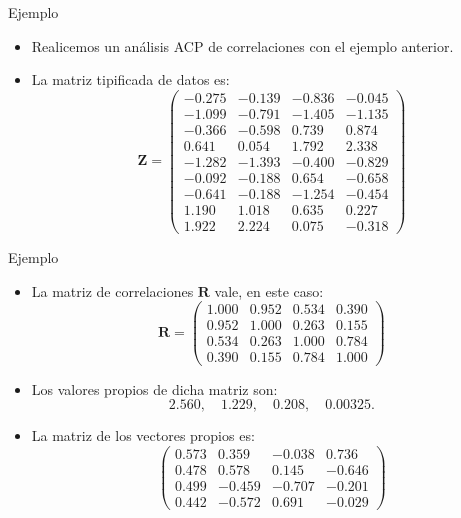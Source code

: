 \documentclass[
  ignorenonframetext,
]{beamer}
\providecommand{\tightlist}{%
  \setlength{\itemsep}{0pt}\setlength{\parskip}{0pt}}
\begin{document}
\begin{frame}{Ejemplo}
\protect\hypertarget{ejemplo-11}{}
\begin{itemize}
\tightlist
\item
  Realicemos un análisis ACP de correlaciones con el ejemplo anterior.
\item
  La matriz tipificada de datos es: \[
  \mathbf{Z}=
  \left(
  \begin{array}{rrrr}
  -0.275 & -0.139 & -0.836 & -0.045 \\
   -1.099 & -0.791 & -1.405 & -1.135 \\
   -0.366 & -0.598 & 0.739 & 0.874 \\
   0.641 & 0.054 & 1.792 & 2.338 \\
   -1.282 & -1.393 & -0.400 & -0.829 \\
   -0.092 & -0.188 & 0.654 & -0.658 \\
   -0.641 & -0.188 & -1.254 & -0.454 \\
   1.190 & 1.018 & 0.635 & 0.227 \\
   1.922 & 2.224 & 0.075 & -0.318 
  \end{array}
  \right)
  \]
\end{itemize}
\end{frame}

\begin{frame}{Ejemplo}
\protect\hypertarget{ejemplo-12}{}
\begin{itemize}
\tightlist
\item
  La matriz de correlaciones \(\mathbf{R}\) vale, en este caso: \[
  \mathbf{R} =
  \left(
  \begin{array}{rrrr}
  1.000 & 0.952 & 0.534 & 0.390 \\
  0.952 & 1.000 & 0.263 & 0.155 \\
  0.534 & 0.263 & 1.000 & 0.784 \\
  0.390 & 0.155 & 0.784 & 1.000 
  \end{array}
  \right)
  \]
\item
  Los valores propios de dicha matriz son: \[
  2.560,\quad 1.229,\quad 0.208,\quad 0.00325.
  \]
\item
  La matriz de los vectores propios es: \[
  \left(
  \begin{array}{rrrr}
  0.573 & 0.359 & -0.038 & 0.736 \\
  0.478 & 0.578 & 0.145 & -0.646 \\
  0.499 & -0.459 & -0.707 & -0.201 \\
  0.442 & -0.572 & 0.691 & -0.029 
  \end{array}
  \right)
  \]
\end{itemize}
\end{frame}
\end{document}
